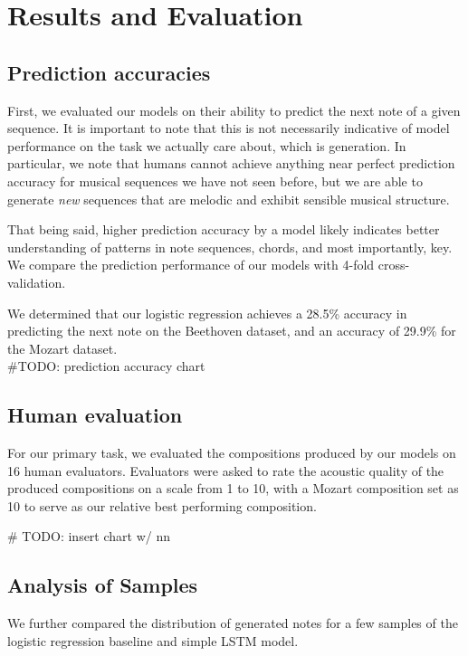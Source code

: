 \documentclass[twoside,twocolumn]{article}
\begin{document}


\section{Results and Evaluation}

\subsection{Prediction accuracies}
First, we evaluated our models on their ability to predict the next note of a given sequence. It is important to note that this is not necessarily indicative of model performance on the task we actually care about, which is generation. In particular, we note that humans cannot achieve anything near perfect prediction accuracy for musical sequences we have not seen before, but we are able to generate \textit{new} sequences that are melodic and exhibit sensible musical structure. 

That being said, higher prediction accuracy by a model likely indicates better understanding of patterns in note sequences, chords, and most importantly, key. We compare the prediction performance of our models with 4-fold cross-validation.

We determined that our logistic regression achieves a 28.5\% accuracy  in predicting the next note on the Beethoven dataset, and an accuracy of 29.9\% for the Mozart dataset. \\

\#TODO: prediction accuracy chart


\subsection{Human evaluation}
For our primary task, we evaluated the compositions produced by our models on 16 human
evaluators. Evaluators were asked to rate the acoustic quality of the produced
compositions on a scale from 1 to 10, with a Mozart composition set as 10 to
serve as our relative best performing composition.

\# TODO: insert chart w/ nn 


\subsection{Analysis of Samples}
We further compared the distribution of generated notes for a few samples of the logistic regression baseline and simple LSTM model. 
\end{document}

